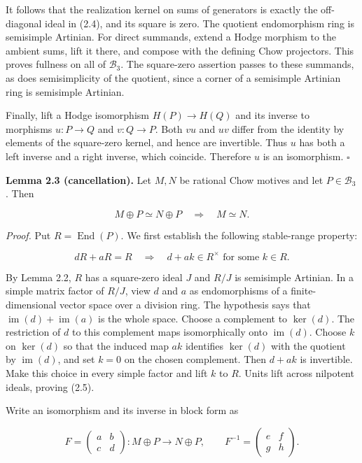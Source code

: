 \documentclass[11pt,a4paper]{article}
\begin{document}
It follows that the realization kernel on sums of generators is exactly the off-diagonal ideal in (2.4), and its square is zero. The quotient endomorphism ring is semisimple Artinian. For direct summands, extend a Hodge morphism to the ambient sums, lift it there, and compose with the defining Chow projectors. This proves fullness on all of $\mathcal B_3$. The square-zero assertion passes to these summands, as does semisimplicity of the quotient, since a corner of a semisimple Artinian ring is semisimple Artinian.

Finally, lift a Hodge isomorphism $H(P)\to H(Q)$ and its inverse to morphisms $u:P\to Q$ and $v:Q\to P$. Both $vu$ and $uv$ differ from the identity by elements of the square-zero kernel, and hence are invertible. Thus $u$ has both a left inverse and a right inverse, which coincide. Therefore $u$ is an isomorphism. $\square$

\noindent \textbf{Lemma 2.3 (cancellation).} Let $M,N$ be rational Chow motives and let $P\in\mathcal B_3$. Then

\begin{equation*}
M\oplus P\simeq N\oplus P
\quad\Longrightarrow\quad M\simeq N.
\end{equation*}

\noindent \emph{Proof.} Put $R=\operatorname{End}(P)$. We first establish the following stable-range property:

\begin{equation*}
dR+aR=R\quad\Longrightarrow\quad
d+ak\in R^\times\text{ for some }k\in R.
\tag{2.5}
\end{equation*}

By Lemma 2.2, $R$ has a square-zero ideal $J$ and $R/J$ is semisimple Artinian. In a simple matrix factor of $R/J$, view $d$ and $a$ as endomorphisms of a finite-dimensional vector space over a division ring. The hypothesis says that $\operatorname{im}(d)+\operatorname{im}(a)$ is the whole space. Choose a complement to $\ker(d)$. The restriction of $d$ to this complement maps isomorphically onto $\operatorname{im}(d)$. Choose $k$ on $\ker(d)$ so that the induced map $ak$ identifies $\ker(d)$ with the quotient by $\operatorname{im}(d)$, and set $k=0$ on the chosen complement. Then $d+ak$ is invertible. Make this choice in every simple factor and lift $k$ to $R$. Units lift across nilpotent ideals, proving (2.5).

Write an isomorphism and its inverse in block form as

\begin{equation*}
F=\begin{pmatrix}a&b\\c&d\end{pmatrix}:
M\oplus P\longrightarrow N\oplus P,
\qquad
F^{-1}=\begin{pmatrix}e&f\\g&h\end{pmatrix}.
\end{equation*}
\end{document}
